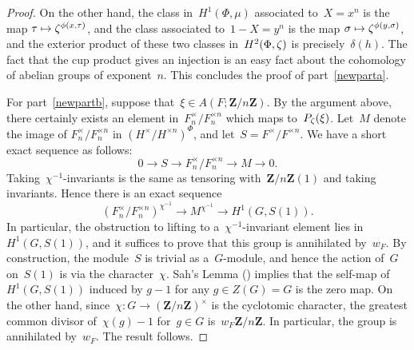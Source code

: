\documentclass[12pt,reqno]{amsart}
\theoremstyle{definition}
\newcommand{\rmk}[1]{{\color{blue} {\rm [#1]}}}
\def\Z{\mathbf Z}   %
\def\nn{n}
\begin{document}
\begin{proof}
On the other hand, the class in~$H^1(\Phi,\mu)$ associated to~$X = x^\nn$ 
is the map $\tau \mapsto \zeta^{\phi(x,\tau)}$, and the class associated 
to~$1-X = y^\nn$ is the map $\sigma \mapsto \zeta^{\phi(y,\sigma)}$, and the 
exterior product of these two classes in~$H^2(\Phi,\zeta)$ is 
precisely~$\delta(h)$. The fact that the cup product gives an injection is 
an easy fact about the cohomology of abelian groups of exponent~$\nn$.
This concludes the proof of part~\ref{newparta}.

For part~\ref{newpartb}, suppose that~$\xi \in A(F;\Z/\nn\Z)$. By the argument above, 
there certainly exists an element in~$F_\nn^{\times}/F_\nn^{\times \nn}$ which 
maps to~$P_\zeta(\xi)$.
Let~$M$ denote the image of $F_\nn^{\times}/F_\nn^{\times \nn}$ in 
$(H^{\times}/H^{\times \nn})^{\Phi}$, and let~$S = F^{\times}/F^{\times \nn}$.
We have a short exact sequence as follows:
$$
0 \longrightarrow S \longrightarrow F_\nn^{\times}/F_\nn^{\times \nn}
\longrightarrow M \longrightarrow 0.
$$
Taking~$\chi^{-1}$-invariants is the same as tensoring with~$\Z/\nn\Z(1)$
and taking invariants. Hence there is an exact sequence
$$
\left(F_\nn^{\times}/F_\nn^{\times \nn}\right)^{\chi^{-1}} \longrightarrow
M^{\chi^{-1}} \longrightarrow H^1(G,S(1)).
$$
In particular, the obstruction to lifting to a~$\chi^{-1}$-invariant
element lies in~$H^1(G,S(1))$, and it 
suffices to prove that this group is annihilated by~$w_F$. 
By construction, the module~$S$ is trivial as a~$G$-module,
and hence the action of~$G$ on~$S(1)$ is via the character~$\chi$.
Sah's Lemma (\cite[Lem.8.8.1]{Lang}) 
implies that the self-map of
$H^1(G,S(1))$ induced by $g-1$ for any $g \in Z(G) = G$ is the zero map. 
On the other hand, since~$\chi: G \rightarrow (\Z/\nn\Z)^{\times}$
is the cyclotomic character, the greatest common divisor 
of~$\chi(g) - 1$ for~$g \in G$ is~$w_F  \Z/\nn\Z$. In particular,
the group is annihilated by~$w_F$. The result follows.
\end{proof}
\end{document}
